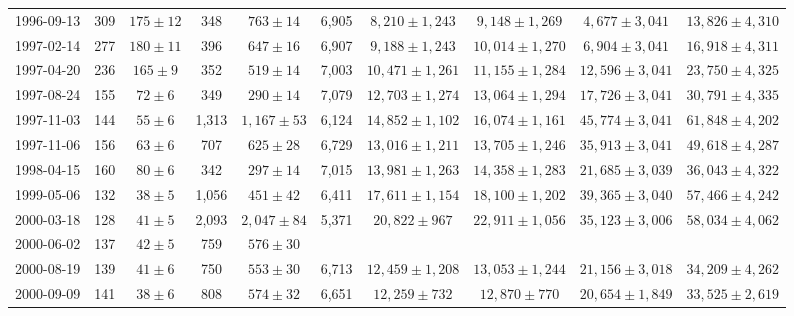 \documentclass[12pt,letterpaper]{article}
\begin{document}
\begin{landscape}
\begin{longtable}{cccccccccc}
 {1996-09-13} &  309 &  {$175  \pm  12$} &    348 &     {$763 \pm 14$} &  6,905 &   {$8,210 \pm 1,243$} &   {$9,148 \pm 1,269$} &   {$4,677 \pm 3,041$} &  {$13,826 \pm 4,310$} \\
 {1997-02-14} &  277 &  {$180  \pm  11$} &    396 &     {$647 \pm 16$} &  6,907 &   {$9,188 \pm 1,243$} &  {$10,014 \pm 1,270$} &   {$6,904 \pm 3,041$} &  {$16,918 \pm 4,311$} \\
 {1997-04-20} &  236 &   {$165  \pm  9$} &    352 &     {$519 \pm 14$} &  7,003 &  {$10,471 \pm 1,261$} &  {$11,155 \pm 1,284$} &  {$12,596 \pm 3,041$} &  {$23,750 \pm 4,325$} \\
 {1997-08-24} &  155 &    {$72  \pm  6$} &    349 &     {$290 \pm 14$} &  7,079 &  {$12,703 \pm 1,274$} &  {$13,064 \pm 1,294$} &  {$17,726 \pm 3,041$} &  {$30,791 \pm 4,335$} \\
 {1997-11-03} &  144 &    {$55  \pm  6$} &  1,313 &   {$1,167 \pm 53$} &  6,124 &  {$14,852 \pm 1,102$} &  {$16,074 \pm 1,161$} &  {$45,774 \pm 3,041$} &  {$61,848 \pm 4,202$} \\
 {1997-11-06} &  156 &    {$63  \pm  6$} &    707 &     {$625 \pm 28$} &  6,729 &  {$13,016 \pm 1,211$} &  {$13,705 \pm 1,246$} &  {$35,913 \pm 3,041$} &  {$49,618 \pm 4,287$} \\
 {1998-04-15} &  160 &    {$80  \pm  6$} &    342 &     {$297 \pm 14$} &  7,015 &  {$13,981 \pm 1,263$} &  {$14,358 \pm 1,283$} &  {$21,685 \pm 3,039$} &  {$36,043 \pm 4,322$} \\
 {1999-05-06} &  132 &    {$38  \pm  5$} &  1,056 &     {$451 \pm 42$} &  6,411 &  {$17,611 \pm 1,154$} &  {$18,100 \pm 1,202$} &  {$39,365 \pm 3,040$} &  {$57,466 \pm 4,242$} \\
 {2000-03-18} &  128 &    {$41  \pm  5$} &  2,093 &   {$2,047 \pm 84$} &  5,371 &    {$20,822 \pm 967$} &  {$22,911 \pm 1,056$} &  {$35,123 \pm 3,006$} &  {$58,034 \pm 4,062$} \\
 {2000-06-02} &  137 &    {$42  \pm  5$} &    759 &     {$576 \pm 30$} &        &                       &                       &                       &                       \\
 {2000-08-19} &  139 &    {$41  \pm  6$} &    750 &     {$553 \pm 30$} &  6,713 &  {$12,459 \pm 1,208$} &  {$13,053 \pm 1,244$} &  {$21,156 \pm 3,018$} &  {$34,209 \pm 4,262$} \\
 {2000-09-09} &  141 &    {$38  \pm  6$} &    808 &     {$574 \pm 32$} &  6,651 &    {$12,259 \pm 732$} &    {$12,870 \pm 770$} &  {$20,654 \pm 1,849$} &  {$33,525 \pm 2,619$} \\

\end{longtable}
\end{landscape}
\end{document}
